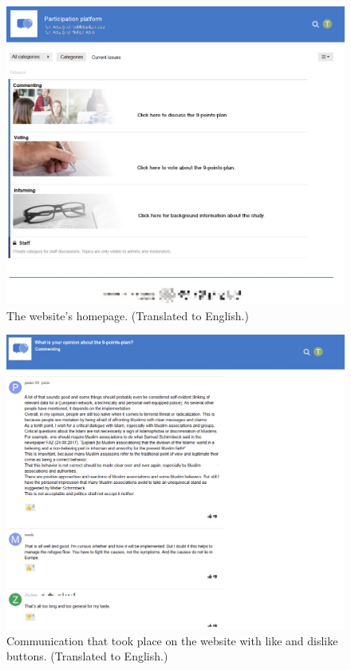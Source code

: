 \documentclass[
  english,
  man,floatsintext]{apa6}
\begin{document}
\begin{figure}

{\centering \includegraphics[width=.9\textwidth]{figures/website/website_translated} 

}

\caption{The website's homepage. (Translated to English.)}\label{fig:website}
\end{figure}

\begin{figure}

{\centering \includegraphics[width=.9\textwidth]{figures/website/comments_translated} 

}

\caption{Communication that took place on the website with like and dislike buttons. (Translated to English.)}\label{fig:comments}
\end{figure}
\end{document}
